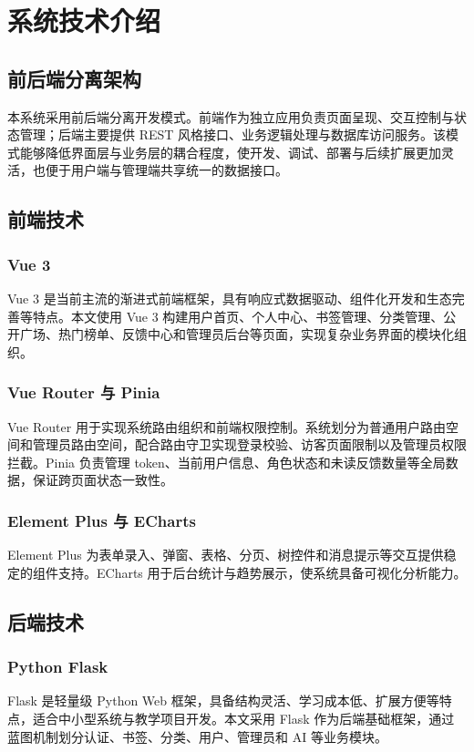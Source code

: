 \documentclass[12pt,a4paper]{ctexart}
\begin{document}
\clearpage
\section{系统技术介绍}

\subsection{前后端分离架构}
本系统采用前后端分离开发模式。前端作为独立应用负责页面呈现、交互控制与状态管理；后端主要提供 REST 风格接口、业务逻辑处理与数据库访问服务。该模式能够降低界面层与业务层的耦合程度，使开发、调试、部署与后续扩展更加灵活，也便于用户端与管理端共享统一的数据接口。

\subsection{前端技术}
\subsubsection{Vue 3}
Vue 3 是当前主流的渐进式前端框架，具有响应式数据驱动、组件化开发和生态完善等特点。本文使用 Vue 3 构建用户首页、个人中心、书签管理、分类管理、公开广场、热门榜单、反馈中心和管理员后台等页面，实现复杂业务界面的模块化组织。

\subsubsection{Vue Router 与 Pinia}
Vue Router 用于实现系统路由组织和前端权限控制。系统划分为普通用户路由空间和管理员路由空间，配合路由守卫实现登录校验、访客页面限制以及管理员权限拦截。Pinia 负责管理 token、当前用户信息、角色状态和未读反馈数量等全局数据，保证跨页面状态一致性。

\subsubsection{Element Plus 与 ECharts}
Element Plus 为表单录入、弹窗、表格、分页、树控件和消息提示等交互提供稳定的组件支持。ECharts 用于后台统计与趋势展示，使系统具备可视化分析能力。

\subsection{后端技术}
\subsubsection{Python Flask}
Flask 是轻量级 Python Web 框架，具备结构灵活、学习成本低、扩展方便等特点，适合中小型系统与教学项目开发。本文采用 Flask 作为后端基础框架，通过蓝图机制划分认证、书签、分类、用户、管理员和 AI 等业务模块。
\end{document}
